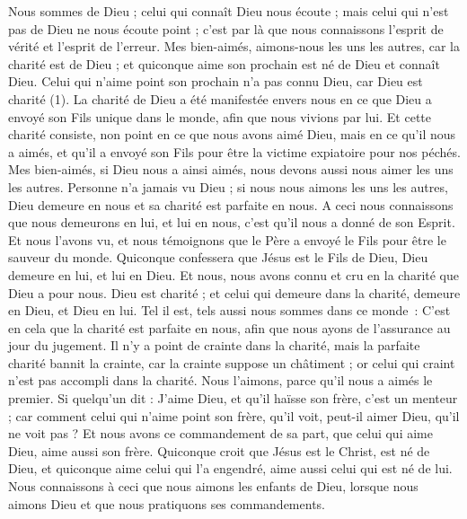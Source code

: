 \begin{multicols}{2}
Nous sommes de Dieu ; celui qui connaît Dieu nous écoute ; mais celui qui n'est pas de Dieu ne nous écoute point ; c’est par là que nous connaissons l'esprit de vérité et l'esprit de l’erreur.
Mes bien-aimés, aimons-nous les uns les autres, car la charité est de Dieu ; et quiconque aime son prochain est né de Dieu et connaît Dieu.
Celui qui n'aime point son prochain n'a pas connu Dieu, car Dieu est charité (1).
La charité de Dieu a été manifestée envers nous en ce que Dieu a envoyé son Fils unique dans le monde, afin que nous vivions par lui.
Et cette charité consiste, non point en ce que nous avons aimé Dieu, mais en ce qu'il nous a aimés, et qu'il a envoyé son Fils pour être la victime expiatoire pour nos péchés.
Mes bien-aimés, si Dieu nous a ainsi aimés, nous devons aussi nous aimer les uns les autres.
Personne n'a jamais vu Dieu ; si nous nous aimons les uns les autres, Dieu demeure en nous et sa charité est parfaite en nous.
A ceci nous connaissons que nous demeurons en lui, et lui en nous, c'est qu'il nous a donné de son Esprit.
Et nous l'avons vu, et nous témoignons que le Père a envoyé le Fils pour être le sauveur du monde.
Quiconque confessera que Jésus est le Fils de Dieu, Dieu demeure en lui, et lui en Dieu.
Et nous, nous avons connu et cru en la charité que Dieu a pour nous. Dieu est charité ; et celui qui demeure dans la charité, demeure en Dieu, et Dieu en lui.
Tel il est, tels aussi nous sommes dans ce monde : C’est en cela que la charité est parfaite en nous, afin que nous ayons de l’assurance au jour du jugement.
Il n'y a point de crainte dans la charité, mais la parfaite charité bannit la crainte, car la crainte suppose un châtiment ; or celui qui craint n'est pas accompli dans la charité.
Nous l'aimons, parce qu'il nous a aimés le premier.
Si quelqu'un dit : J'aime Dieu, et qu’il haïsse son frère, c’est un menteur ; car comment celui qui n'aime point son frère, qu'il voit, peut-il aimer Dieu, qu’il ne voit pas ?
Et nous avons ce commandement de sa part, que celui qui aime Dieu, aime aussi son frère.
\VerseOne{}Quiconque croit que Jésus est le Christ, est né de Dieu, et quiconque aime celui qui l'a engendré, aime aussi celui qui est né de lui.
Nous connaissons à ceci que nous aimons les enfants de Dieu, lorsque nous aimons Dieu et que nous pratiquons ses commandements.

\end{multicols}
